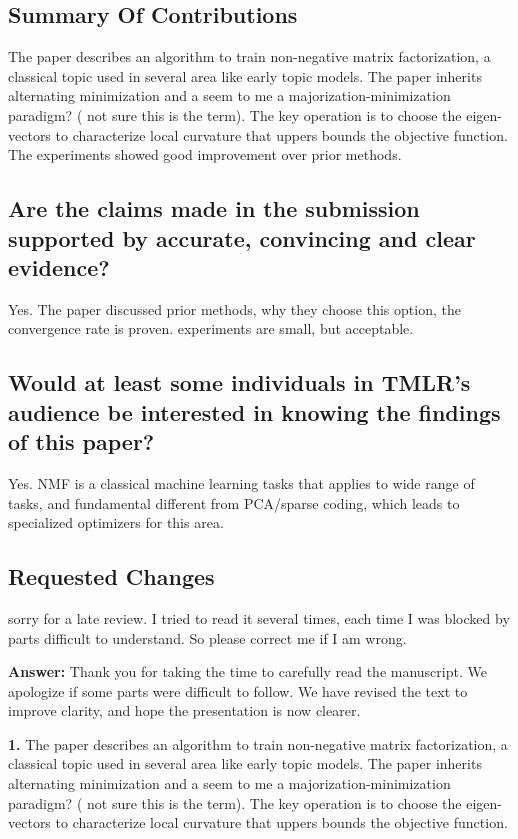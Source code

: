 \documentclass[10pt]{article} %
\newcommand{\answer}[1]{{\textbf{Answer:} \color{blue} #1}}
\begin{document}
\subsection{Summary Of Contributions}
The paper describes an algorithm to train non-negative matrix factorization, a classical topic used in several area like early topic models. The paper inherits alternating minimization and a seem to me a majorization-minimization paradigm? ( not sure this is the term). The key operation is to choose the eigen-vectors to characterize local curvature that uppers bounds the objective function. The experiments showed good improvement over prior methods.

\subsection{Are the claims made in the submission supported by accurate, convincing and clear evidence?} Yes. The paper discussed prior methods, why they choose this option, the convergence rate is proven. experiments are small, but acceptable.

\subsection{Would at least some individuals in TMLR's audience be interested in knowing the findings of this paper?}
Yes. NMF is a classical machine learning tasks that applies to wide range of tasks, and fundamental different from PCA/sparse coding, which leads to specialized optimizers for this area.


\subsection{Requested Changes}
sorry for a late review. I tried to read it several times, each time I was blocked by parts difficult to understand. So please correct me if I am wrong.

\answer{Thank you for taking the time to carefully read the manuscript. We apologize if some parts were difficult to follow. We have revised the text to improve clarity, and hope the presentation is now clearer.}

\textbf{1.} The paper describes an algorithm to train non-negative matrix factorization, a classical topic used in several area like early topic models. The paper inherits alternating minimization and a seem to me a majorization-minimization paradigm? ( not sure this is the term). The key operation is to choose the eigen-vectors to characterize local curvature that uppers bounds the objective function.
\end{document}
